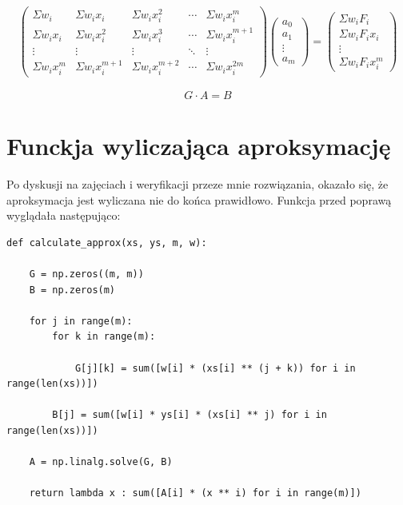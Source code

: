 \documentclass{article}
\begin{document}
\begin{gather*}
\begin{pmatrix}
\Sigma w_i & \Sigma w_ix_i & \Sigma w_ix_i^2 & \cdots & \Sigma w_ix_i^m \\
\Sigma w_ix_i & \Sigma w_ix_i^2 & \Sigma w_ix_i^3 & \cdots & \Sigma w_ix_i^{m+1} \\
\vdots & \vdots & \vdots & \ddots & \vdots \\
\Sigma w_ix_i^m & \Sigma w_ix_i^{m+1} & \Sigma w_ix_i^{m+2} & \cdots & \Sigma w_ix_i^{2m} 
\end{pmatrix} 
\begin{pmatrix}
a_0 \\
a_1 \\
\vdots \\
a_m 
\end{pmatrix}
= 
\begin{pmatrix}
\Sigma w_iF_i \\
\Sigma w_iF_ix_i \\
\vdots \\
\Sigma w_iF_ix_i^m 
\end{pmatrix}
\end{gather*}

\[G \cdot A=B\]

\section{Funckja wyliczająca aproksymację}

Po dyskusji na zajęciach i weryfikacji przeze mnie rozwiązania, okazało się, że aproksymacja jest wyliczana nie do końca prawidłowo. 
\bigbreak
\noindent
Funkcja przed poprawą wyglądała następująco:

\begin{verbatim}
def calculate_approx(xs, ys, m, w):
    
    G = np.zeros((m, m))
    B = np.zeros(m)
    
    for j in range(m):
        for k in range(m):
            
            G[j][k] = sum([w[i] * (xs[i] ** (j + k)) for i in range(len(xs))])
        
        B[j] = sum([w[i] * ys[i] * (xs[i] ** j) for i in range(len(xs))])
   
    A = np.linalg.solve(G, B) 
    
    return lambda x : sum([A[i] * (x ** i) for i in range(m)])
\end{verbatim}
\end{document}
